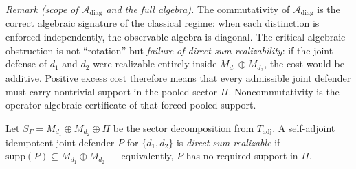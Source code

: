 \documentclass[11pt]{article}
\theoremstyle{remark}
\begin{document}
\smallskip\noindent\textit{Remark (scope of $\mathcal{A}_{\mathrm{diag}}$ and the full algebra).}
The commutativity of $\mathcal{A}_{\mathrm{diag}}$ is the correct algebraic signature of the classical regime: when each distinction is enforced independently, the observable algebra is diagonal.  The critical algebraic obstruction is not ``rotation'' but \emph{failure of direct-sum realizability}: if the joint defense of $d_1$ and $d_2$ were realizable entirely inside $M_{d_1} \oplus M_{d_2}$, the cost would be additive.  Positive excess cost therefore means that every admissible joint defender must carry nontrivial support in the pooled sector $\Pi$.  Noncommutativity is the operator-algebraic certificate of that forced pooled support.

\begin{tcolorbox}[defbox, title={Definition: Direct-Sum Realizability}]
\label{def:ds_realizable}
Let $S_\Gamma = M_{d_1} \oplus M_{d_2} \oplus \Pi$ be the sector decomposition from $T_{\mathrm{adj}}$.  A self-adjoint idempotent joint defender $P$ for $\{d_1, d_2\}$ is \emph{direct-sum realizable} if $\mathrm{supp}(P) \subseteq M_{d_1} \oplus M_{d_2}$ --- equivalently, $P$ has no required support in $\Pi$.
\end{tcolorbox}
\end{document}
